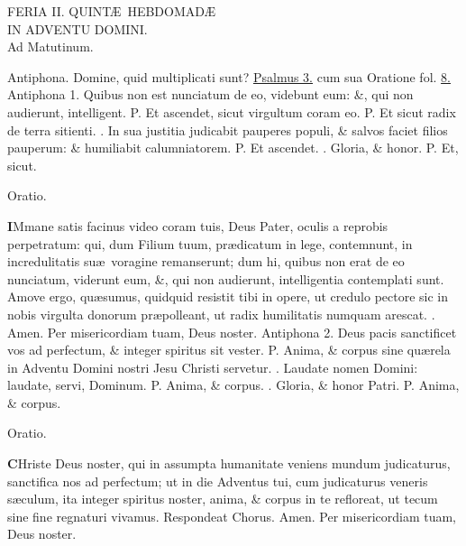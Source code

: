 \documentclass[letter,11pt]{book}
\makeatletter
\DeclareRobustCommand{\Vbar}{\vers@resp{-0.1em}{V}}
\DeclareRobustCommand{\Rbar}{\vers@resp{0pt}{R}}
\newcommand{\vers@resp@sym}{\raisebox{0.2ex}{\rotatebox[origin=c]{-20}{$\m@th\rceil$}}}
\newcommand{\vers@resp}[2]{%
  {\ooalign{\hidewidth\kern#1\vers@resp@sym\hidewidth\cr#2\cr}}%
}%
\def\P{\color{Red} P. \color{black}}
\def\V{\color{Red} \Vbar . \color{black}}
\def\R{\color{Red} \Rbar . \color{black}}
\makeatother
\begin{document}
\begin{multicols}{2}
\begin{center}
FERIA II. QUINT\AE \ HEBDOMAD\AE \\
\color{black} IN ADVENTU DOMINI.\\
\color{Red} Ad Matutinum.
\end{center}
\vspace{-.75em}
\par \noindent \color{Red} Antiphona. \color{black} Domine, quid multiplicati sunt? \color{Red} \hyperlink{ps3}{Psalmus 3.} cum sua Oratione fol. \color{black} \hyperlink{MON-PRIMA-ADV-MAT}{8.}
\newline \color{Red} Antiphona 1. \color{black} Quibus non est nunciatum de eo, videbunt eum: \&, qui non audierunt, intelligent. \P Et ascendet, sicut virgultum coram eo. \P Et sicut radix de terra sitienti. \V In sua justitia judicabit pauperes populi, \& salvos faciet filios pauperum: \& humiliabit calumniatorem. \P Et ascendet. \V Gloria, \& honor. \P Et, sicut.
\vspace{-.5em} \begin{center} \color{Red} Oratio. \color{black} \end{center} \vspace{-.5em}
\lettrine[lines=2]{\bfseries \color{Red} I}{}Mmane satis facinus video coram tuis, Deus Pater, oculis a reprobis perpetratum: qui, dum Filium tuum, pr\ae dicatum in lege, contemnunt, in incredulitatis su\ae \ voragine remanserunt; dum hi, quibus non erat de eo nunciatum, viderunt eum, \&, qui non audierunt, intelligentia contemplati sunt. Amove ergo, qu\ae sumus, quidquid resistit tibi in opere, ut credulo pectore sic in nobis virgulta donorum pr\ae polleant, ut radix humilitatis numquam arescat. \R Amen. Per misericordiam tuam, Deus noster.
\newline \color{Red} Antiphona 2. \color{black} Deus pacis sanctificet vos ad perfectum, \& integer spiritus sit vester. \P Anima, \& corpus sine qu\ae rela in Adventu Domini nostri Jesu Christi servetur. \V Laudate nomen Domini: laudate, servi, Dominum. \P Anima, \& corpus. \V Gloria, \& honor Patri. \P Anima, \& corpus.
\vspace{-.5em} \begin{center} \color{Red} Oratio. \color{black} \end{center} \vspace{-.5em}
\lettrine[lines=2]{\bfseries \color{Red} C}{}Hriste Deus noster, qui in assumpta humanitate veniens mundum judicaturus, sanctifica nos ad perfectum; ut in die Adventus tui, cum judicaturus veneris s\ae culum, ita integer spiritus noster, anima, \& corpus in te refloreat, ut tecum sine fine regnaturi vivamus. \color{Red} Respondeat Chorus. \color{black} Amen. Per misericordiam tuam, Deus noster.

\end{multicols}
\end{document}
